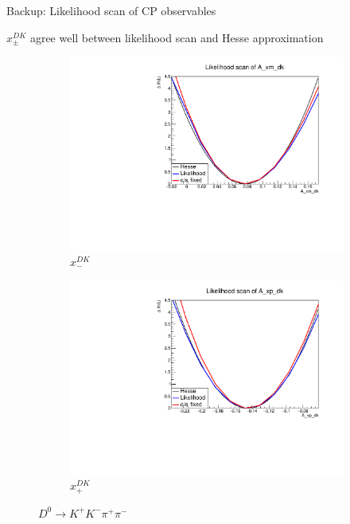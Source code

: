 \documentclass[xcolor={dvipsnames}]{beamer}
\begin{document}
\begin{frame}{Backup: Likelihood scan of CP observables}
  \begin{center}
    $x_\pm^{DK}$ agree well between likelihood scan and Hesse approximation
  \end{center}
  \begin{figure}
    \centering
    \begin{subfigure}{0.5\textwidth}
      \centering
      \includegraphics[width=1.0\textwidth]{Plots/A_xm_dk_likelihood_scan_KKpipi.pdf}
      \vspace{-0.3cm}
      \caption*{$x_-^{DK}$}
    \end{subfigure}%
    \begin{subfigure}{0.5\textwidth}
      \centering
      \includegraphics[width=1.0\textwidth]{Plots/A_xp_dk_likelihood_scan_KKpipi.pdf}
      \vspace{-0.3cm}
      \caption*{$x_+^{DK}$}
    \end{subfigure}
    \caption*{$D^0\to K^+K^-\pi^+\pi^-$}
  \end{figure}
\end{frame}
\end{document}

